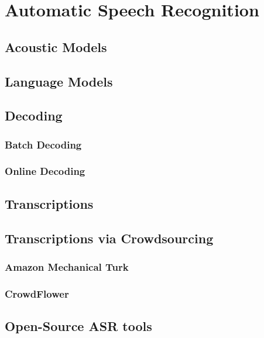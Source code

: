 \chapter{Automatic Speech Recognition}
\blindtext

\section{Acoustic Models}
\blindtext
\blindtext

\section{Language Models}
\blindtext
\blindtext

\section{Decoding}
\blindtext

\subsection{Batch Decoding}
\blindtext

\subsection{Online Decoding}
\blindtext


\section{Transcriptions}
\blindtext

\section{Transcriptions via Crowdsourcing}
\blindtext

\subsection{Amazon Mechanical Turk}
\blindtext

\subsection{CrowdFlower}
\blindtext


\section{Open-Source ASR tools}


